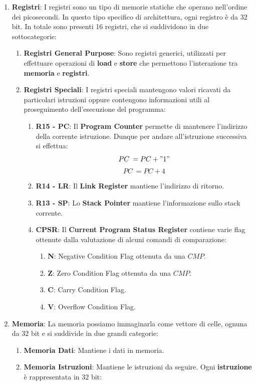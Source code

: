 \documentclass{article}
\begin{document}
\begin{enumerate}
    \item \textbf{Registri}: I registri sono un tipo di memorie statiche che operano nell'ordine dei picosecondi. In questo tipo specifico di architettura, ogni registro è da $32$ bit. In totale sono presenti 16 registri, che si suddividono in due sottocategorie:
    \begin{enumerate}
        \item \textbf{Registri General Purpose}: Sono registri generici, utilizzati per effettuare operazioni di \textbf{load} e \textbf{store} che permettono l'interazione tra \textbf{memoria} e \textbf{registri}.
        \item \textbf{Registri Speciali}: I registri speciali mantengono valori ricavati da particolari istruzioni oppure contengono informazioni utili al proseguimento dell'esecuzione del programma:
        \begin{enumerate}
            \item \textbf{R15 - PC}: Il \textbf{Program Counter} permette di mantenere l'indirizzo della corrente istruzione. Dunque per andare all'istruzione successiva si effettua:
            \[ PC \: = PC + "1" \]
            \vspace*{-20px}
            \[ PC \: = PC + 4 \]
            \item \textbf{R14 - LR}: Il \textbf{Link Register} mantiene l'indirizzo di ritorno.
            \item \textbf{R13 - SP}: Lo \textbf{Stack Pointer} mantiene l'informazione sullo stack corrente.
            \item \textbf{CPSR}: Il \textbf{Current Program Status Register} contiene varie flag ottenute dalla valutazione di alcuni comandi di comparazione:
            \begin{enumerate}
                \item \textbf {N}: Negative Condition Flag ottenuta da una $CMP$.
                \item \textbf {Z}: Zero Condition Flag ottenuta da una $CMP$.
                \item \textbf {C}: Carry Condition Flag.
                \item \textbf {V}: Overflow Condition Flag.
            \end{enumerate}
        \end{enumerate}
    \end{enumerate}

    \vspace*{15px}
    
    \item \textbf{Memoria}: La memoria possiamo immaginarla come vettore di celle, ognuna da $32$ bit e si suddivide in due grandi categorie:
    \begin{enumerate}
        \item \textbf{Memoria Dati}: Mantiene i dati in memoria.
        \item \textbf{Memoria Istruzioni}: Mantiene le istruzioni da seguire. Ogni \textbf{istruzione} è rappresentata in $32$ bit:
    \end{enumerate}
\end{enumerate}
\end{document}

